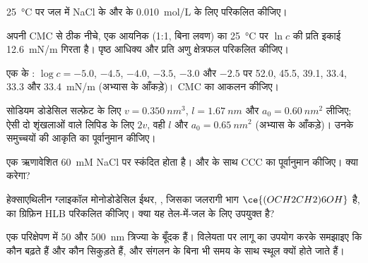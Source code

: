 \begin{exercise}[$\star$]\label{exo:b3:colloids:4}
\qty{25}{\celsius} पर जल में NaCl के और  के \qty{0.010}{mol/L} के लिए 
परिकलित कीजिए।
\end{exercise}

\begin{exercise}[$\star\star$]\label{exo:b3:colloids:5}
अपनी CMC से ठीक नीचे, एक आयनिक  (1:1, बिना लवण) का 
\qty{25}{\celsius} पर $\ln c$ की प्रति इकाई \qty{12.6}{mN/m} गिरता है। पृष्ठ आधिक्य और
प्रति अणु क्षेत्रफल परिकलित कीजिए।
\end{exercise}

\begin{exercise}[$\star\star$]\label{exo:b3:colloids:6}
एक  के : $\log c = -5.0$, $-4.5$, $-4.0$, $-3.5$, $-3.0$ और $-2.5$ पर
52.0, 45.5, 39.1, 33.4, 33.3 और \qty{33.4}{mN/m} (अभ्यास के आँकड़े)।
CMC का आकलन कीजिए।
\end{exercise}

\begin{exercise}[$\star\star$]\label{exo:b3:colloids:7}
सोडियम डोडेसिल सल्फ़ेट के लिए $v = \qty{0.350}{nm^3}$, $l = \qty{1.67}{nm}$ और $a_0 = \qty{0.60}{nm^2}$ लीजिए; ऐसी
दो शृंखलाओं वाले लिपिड के लिए $2v$, वही $l$ और $a_0 = \qty{0.65}{nm^2}$ (अभ्यास के
आँकड़े)। उनके समुच्चयों की आकृति का पूर्वानुमान कीजिए।
\end{exercise}

\begin{exercise}[$\star\star$]\label{exo:b3:colloids:8}
एक ऋणावेशित  \qty{60}{mM} NaCl पर स्कंदित होता है। 
और  के साथ CCC का पूर्वानुमान कीजिए।  क्या करेगा?
\end{exercise}

\begin{exercise}[$\star\star$]\label{exo:b3:colloids:9}
हेक्साएथिलीन ग्लाइकॉल मोनोडोडेसिल ईथर,
, जिसका जलरागी भाग $\ce{(OCH2CH2)6OH}$ है, का ग्रिफ़िन HLB परिकलित कीजिए। क्या यह
तेल-में-जल  के लिए उपयुक्त है?
\end{exercise}

\begin{exercise}[$\star\star\star$]\label{exo:b3:colloids:10}
एक परिक्षेपण में 50 और \qty{500}{nm} त्रिज्या के बूँदक हैं। विलेयता पर लागू  का उपयोग करके समझाइए कि कौन बढ़ते हैं और कौन सिकुड़ते हैं, और
 संगलन के बिना भी समय के साथ स्थूल क्यों होते जाते हैं।
\end{exercise}

